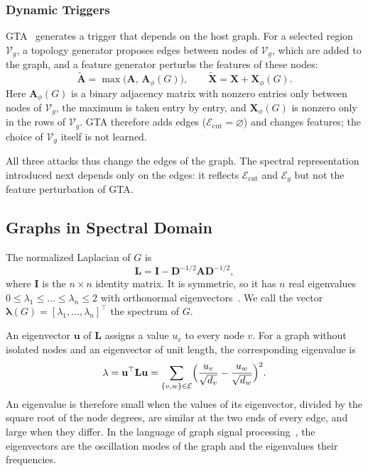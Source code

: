 \documentclass[journal]{IEEEtran}
\newcommand{\bA}{\mathbf{A}}            %
\newcommand{\bD}{\mathbf{D}}            %
\newcommand{\bX}{\mathbf{X}}            %
\newcommand{\bL}{\mathbf{L}}            %
\newcommand{\bI}{\mathbf{I}}            %
\newcommand{\bu}{\mathbf{u}}            %
\newcommand{\blam}{\boldsymbol{\lambda}}%
\newcommand{\calV}{\mathcal{V}}         %
\newcommand{\calE}{\mathcal{E}}         %
\begin{document}
\subsubsection{Dynamic Triggers}\label{sec:dynamic}
GTA~\cite{gta2021} generates a trigger that depends on the host graph. For a
selected region $\calV_g$, a topology generator proposes edges between nodes of
$\calV_g$, which are added to the graph, and a feature generator perturbs the
features of these nodes:
\begin{equation}
\tilde{\bA}=\max\bigl(\bA,\,\bA_\phi(G)\bigr),\qquad
\tilde{\bX}=\bX+\bX_\phi(G).
\label{eq:dynamic-trigger}
\end{equation}
Here $\bA_\phi(G)$ is a binary adjacency matrix with nonzero entries only
between nodes of $\calV_g$, the maximum is taken entry by entry, and
$\bX_\phi(G)$ is nonzero only in the rows of $\calV_g$. GTA therefore adds edges
($\calE_{\mathrm{cut}}=\varnothing$) and changes features; the choice of
$\calV_g$ itself is not learned.

All three attacks thus change the edges of the graph. The spectral
representation introduced next depends only on the edges: it reflects
$\calE_{\mathrm{cut}}$ and $\calE_g$ but not the feature perturbation of GTA.

\subsection{Graphs in Spectral Domain}\label{sec:spectral}
The normalized Laplacian of $G$ is
\begin{equation}
\bL=\bI-\bD^{-1/2}\bA\bD^{-1/2},
\label{eq:laplacian}
\end{equation}
where $\bI$ is the $n\times n$ identity matrix. It is symmetric, so it has $n$ real eigenvalues
$0\le\lambda_1\le\dots\le\lambda_n\le 2$ with orthonormal
eigenvectors~\cite{chung1997spectral}. We call the vector
$\blam(G)=[\lambda_1,\dots,\lambda_n]^{\top}$ the spectrum of $G$.

An eigenvector $\bu$ of $\bL$ assigns a value
$u_v$ to every node $v$. For a graph without isolated nodes and an eigenvector
of unit length, the corresponding eigenvalue is
\begin{equation}
\lambda=\bu^{\top}\bL\bu=\sum_{\{v,w\}\in\calE}
\Bigl(\frac{u_v}{\sqrt{d_v}}-\frac{u_w}{\sqrt{d_w}}\Bigr)^{2}.
\label{eq:quadratic-form}
\end{equation}
An eigenvalue is therefore small when the values of its eigenvector, divided by
the square root of the node degrees, are similar at the two ends of every
edge, and large when they differ. In the language of graph signal
processing~\cite{shuman2013gsp}, the eigenvectors are the oscillation modes of
the graph and the eigenvalues their frequencies.
\end{document}
